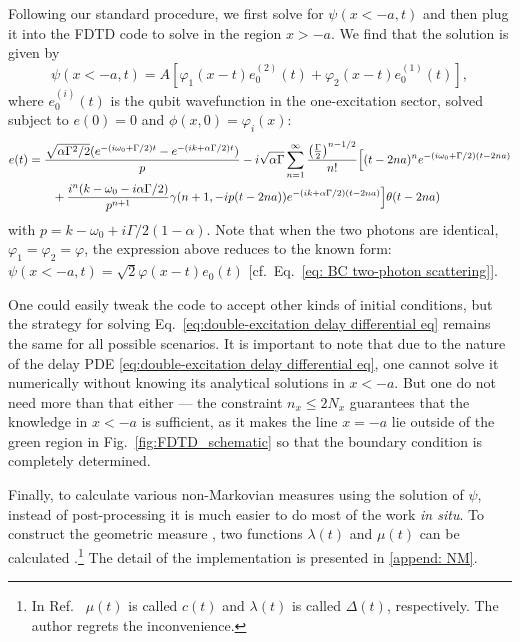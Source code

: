 \documentclass[final,1p,times]{elsarticle}
\begin{document}
\begin{enumerate}
	Following our standard procedure, we first solve for $\psi(x<-a, t)$ and then plug it into the FDTD code to solve in the region $x>-a$. We find that the solution is given by 
	\begin{equation}
	\psi(x<-a, t) = A \left[\varphi_1(x-t) e_0^{(2)}(t) + \varphi_2(x-t) e_0^{(1)}(t) \right],
	\end{equation}
	where $e_0^{(i)}(t)$ is the qubit wavefunction in the one-excitation sector, solved subject to $e(0)=0$ and $\phi(x,0)=\varphi_i(x)$:
	\begin{align}
	e(t)&=\frac{\sqrt{\alpha\Gamma^2/2} (e^{-(i\omega_0+\Gamma /2)t}-e^{-(ik+\alpha\Gamma/2)t})}{p} 
	-i\sqrt{\alpha\Gamma} \sum_{n=1}^{\infty}\frac{\left(\frac{\Gamma}{2}\right)^{n-1/2}}{n!}
	\Bigl[(t-2na)^n e^{-(i\omega_0+\Gamma/2)(t-2na)}\nonumber \\
	&\quad\quad+\frac{i^n(k-\omega_0-i\alpha\Gamma/2)}{p^{n+1}}\gamma(n+1,-ip(t-2na))e^{-(ik+\alpha\Gamma/2)(t-2na)}
	\Bigr]\theta(t-2na)
	\label{eq:exact solution single-photon exponential}
	\end{align}
	with $p=k-\omega_0+i\Gamma/2(1-\alpha)$.
	Note that when the two photons are identical, $\varphi_1=\varphi_2=\varphi$, the expression above reduces to the known form: $\psi(x<-a, t) = \sqrt{2}\varphi(x-t)e_0(t)$ [cf.\ Eq.~\eqref{eq: BC two-photon scattering}]. 
\end{enumerate}
One could easily tweak the code to accept other kinds of initial conditions, but the strategy for solving Eq.~\eqref{eq:double-excitation delay differential eq} remains the same for all possible scenarios. It is important to note that due to the nature of the delay PDE \eqref{eq:double-excitation delay differential eq}, one cannot solve it numerically without knowing its analytical solutions in $x<-a$. But one do not need more than that either --- the constraint $n_x\leq 2N_x$ guarantees that the knowledge in $x<-a$ is sufficient, as it makes the line $x=-a$ lie outside of the green region in Fig.~\ref{fig:FDTD_schematic} so that the boundary condition is completely determined. 

Finally, to calculate various non-Markovian measures using the solution of $\psi$, instead of post-processing it is much easier to do most of the work \emph{in situ}. To construct the geometric measure \cite{LorenzoPRA13}, two functions $\lambda(t)$ and $\mu(t)$ can be calculated \cite{FangNJP18}.\footnote{In Ref.~\cite{FangNJP18} $\mu(t)$ is called $c(t)$ and $\lambda(t)$ is called $\Delta(t)$, respectively. The author regrets the inconvenience.\label{note5}}
The detail of the implementation is presented in \ref{append: NM}. 
\end{document}
